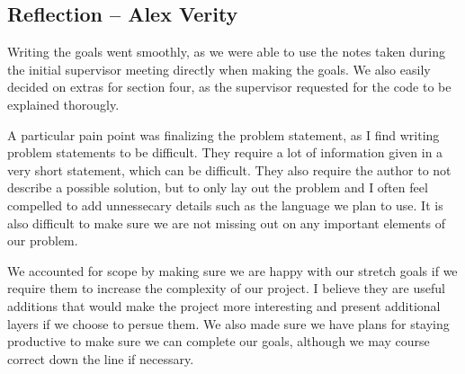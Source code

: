 \documentclass{article}
\begin{document}
\subsection*{Reflection -- Alex Verity}

Writing the goals went smoothly, as we were able to use the notes taken during
the initial supervisor meeting directly when making the goals. We also easily
decided on extras for section four, as the supervisor requested for the code
to be explained thorougly.\newline

A particular pain point was finalizing the problem statement, as I find
writing problem statements to be difficult. They require a lot of information
given in a very short statement, which can be difficult. They also require
the author to not describe a possible solution, but to only lay out the
problem and I often feel compelled to add unnessecary details such as the
language we plan to use. It is also difficult to make sure we are not missing
out on any important elements of our problem.\newline

We accounted for scope by making sure we are happy with our stretch goals if
we require them to increase the complexity of our project. I believe they are
useful additions that would make the project more interesting and present
additional layers if we choose to persue them. We also made sure we have plans
for staying productive to make sure we can complete our goals, although we may
course correct down the line if necessary.
\end{document}
